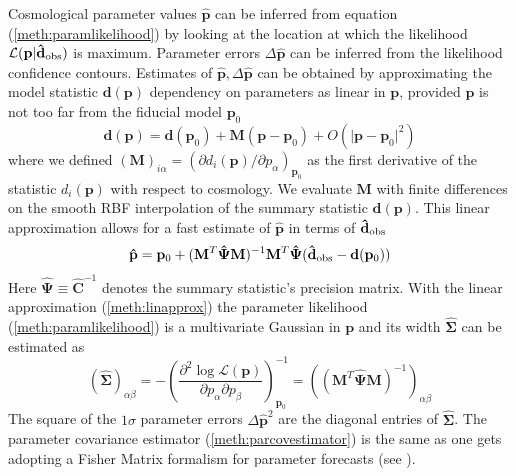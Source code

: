 \documentclass[reprint,aps,prd,superscriptaddress,showkeys,showpacs]{revtex4-1}
\newcommand{\bb}[1]{\mathbf{#1}}
\newcommand{\bbh}[1]{\mathbf{\hat{#1}}}
\begin{document}
%
Cosmological parameter values $\bbh{p}$ can be inferred from equation (\ref{meth:paramlikelihood}) by looking at the location at which the likelihood $\mathcal{L}(\bb{p}\vert\bbh{d}_{\rm obs})$ is maximum. Parameter errors $\Delta\bbh{p}$ can be inferred from the likelihood confidence contours. Estimates of $\bbh{p},\Delta \bbh{p}$ can be obtained by approximating the model statistic $\bb{d}(\bb{p})$ dependency on parameters as linear in $\bb{p}$, provided $\bb{p}$ is not too far from the fiducial model $\bb{p}_0$
\begin{equation}
\label{meth:linapprox}
\bb{d}(\bb{p}) = \bb{d}(\bb{p}_0) + \bb{M}(\bb{p}-\bb{p}_0) + O(\vert\bb{p}-\bb{p}_0\vert^2)
\end{equation} 
%
where we defined $(\bb{M})_{i\alpha}=(\partial d_i(\bb{p})/\partial p_\alpha)_{\bb{p}_0}$ as the first derivative of the statistic $d_i(\bb{p})$ with respect to cosmology. We evaluate $\bb{M}$ with finite differences on the smooth RBF interpolation of the summary statistic $\bb{d}(\bb{p})$. This linear approximation allows for a fast estimate of $\bbh{p}$ in terms of $\bbh{d}_{\rm obs}$
\begin{equation}
\label{meth:parestimate}
\bbh{p} = \bb{p}_0 + (\bb{M}^T\bbh{\Psi}\bb{M})^{-1}\bb{M}^T\bbh{\Psi}(\bbh{d}_{\rm obs}-\bb{d}(\bb{p}_0))
\end{equation}
%
Here $\bbh{\Psi}\equiv\bbh{C}^{-1}$ denotes the summary statistic's precision matrix. With the linear approximation (\ref{meth:linapprox}) the parameter likelihood (\ref{meth:paramlikelihood}) is a multivariate Gaussian in $\bb{p}$ and its width $\bbh{\Sigma}$ can be estimated as 
\begin{equation}
\label{meth:parcovestimator}
(\bbh{\Sigma})_{\alpha\beta} = -\left(\frac{\partial^2 \log \mathcal{L}(\bb{p})}{\partial p_\alpha \partial p_\beta}\right)^{-1}_{\bb{p}_0} = ((\bb{M}^T\bbh{\Psi}\bb{M})^{-1})_{\alpha\beta}
\end{equation}
%
The square of the $1\sigma$ parameter errors $\Delta \bbh{p}^2$ are the diagonal entries of $\bbh{\Sigma}$. The parameter covariance estimator (\ref{meth:parcovestimator}) is the same as one gets adopting a Fisher Matrix formalism for parameter forecasts (see \citep{astroMLText}).
\end{document}
